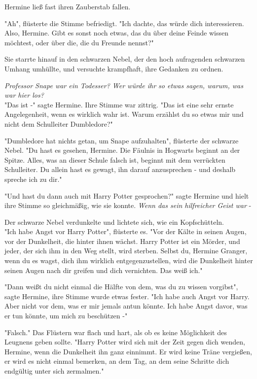 {Hermine ließ fast ihren Zauberstab fallen.

"Ah", flüsterte die Stimme befriedigt. "Ich dachte, das würde dich interessieren. Also, Hermine. Gibt es sonst noch etwas, das du über deine Feinde wissen möchtest, oder über die, die du Freunde nennst?"

Sie starrte hinauf in den schwarzen Nebel, der den hoch aufragenden schwarzen Umhang umhüllte, und versuchte krampfhaft, ihre Gedanken zu ordnen.

\emph{Professor Snape war ein Todesser? Wer würde ihr so etwas sagen, warum, was war hier los?}\\ "Das ist -" sagte Hermine. Ihre Stimme war zittrig. "Das ist eine sehr ernste Angelegenheit, wenn es wirklich wahr ist. Warum erzählst du so etwas mir und nicht dem Schulleiter Dumbledore?"

"Dumbledore hat nichts getan, um Snape aufzuhalten", flüsterte der schwarze Nebel. "Du hast es gesehen, Hermine. Die Fäulnis in Hogwarts beginnt an der Spitze. Alles, was an dieser Schule falsch ist, beginnt mit dem verrückten Schulleiter. Du allein hast es gewagt, ihn darauf anzusprechen - und deshalb spreche ich zu dir."

"Und hast du dann auch mit Harry Potter gesprochen?" sagte Hermine und hielt ihre Stimme so gleichmäßig, wie sie konnte. \emph{Wenn das sein hilfreicher Geist war} -

Der schwarze Nebel verdunkelte und lichtete sich, wie ein Kopfschütteln.\\ "Ich habe Angst vor Harry Potter", flüsterte es. "Vor der Kälte in seinen Augen, vor der Dunkelheit, die hinter ihnen wächst. Harry Potter ist ein Mörder, und jeder, der sich ihm in den Weg stellt, wird sterben. Selbst du, Hermine Granger, wenn du es wagst, dich ihm wirklich entgegenzustellen, wird die Dunkelheit hinter seinen Augen nach dir greifen und dich vernichten. Das weiß ich."

"Dann weißt du nicht einmal die Hälfte von dem, was du zu wissen vorgibst", sagte Hermine, ihre Stimme wurde etwas fester. "Ich habe auch Angst vor Harry. Aber nicht vor dem, was er mir jemals antun könnte. Ich habe Angst davor, was er tun könnte, um mich zu beschützen -"

"Falsch." Das Flüstern war flach und hart, als ob es keine Möglichkeit des Leugnens geben sollte. "Harry Potter wird sich mit der Zeit gegen dich wenden, Hermine, wenn die Dunkelheit ihn ganz einnimmt. Er wird keine Träne vergießen, er wird es nicht einmal bemerken, an dem Tag, an dem seine Schritte dich endgültig unter sich zermalmen."

}

